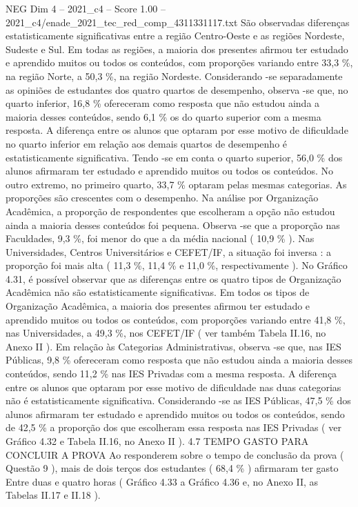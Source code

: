 \begin{textsample}{NEG Dim 4 – 2021\_c4 – Score 1.00 – 2021\_c4/enade\_2021\_tec\_red\_comp\_4311331117.txt}
São observadas diferenças estatisticamente significativas entre a região Centro-Oeste e as regiões Nordeste, Sudeste e Sul.
Em todas as regiões, a maioria dos presentes afirmou ter estudado e aprendido muitos ou todos os conteúdos, com proporções variando entre 33,3 \%, na região Norte, a 50,3 \%, na região Nordeste.
Considerando -se separadamente as opiniões de estudantes dos quatro quartos de desempenho, observa -se que, no quarto inferior, 16,8 \% ofereceram como resposta que não estudou ainda a maioria desses conteúdos, sendo 6,1 \% os do quarto superior com a mesma resposta.
A diferença entre os alunos que optaram por esse motivo de dificuldade no quarto inferior em relação aos demais quartos de desempenho é estatisticamente significativa.
Tendo -se em conta o quarto superior, 56,0 \% dos alunos afirmaram ter estudado e aprendido muitos ou todos os conteúdos.
No outro extremo, no primeiro quarto, 33,7 \% optaram pelas mesmas categorias.
As proporções são crescentes com o desempenho.
Na análise por Organização Acadêmica, a proporção de respondentes que escolheram a opção não estudou ainda a maioria desses conteúdos foi pequena.
Observa -se que a proporção nas Faculdades, 9,3 \%, foi menor do que a da média nacional ( 10,9 \% ).
Nas Universidades, Centros Universitários e CEFET/IF, a situação foi inversa : a proporção foi mais alta ( 11,3 \%, 11,4 \% e 11,0 \%, respectivamente ).
No Gráfico 4.31, é possível observar que as diferenças entre os quatro tipos de Organização Acadêmica não são estatisticamente significativas.
Em todos os tipos de Organização Acadêmica, a maioria dos presentes afirmou ter estudado e aprendido muitos ou todos os conteúdos, com proporções variando entre 41,8 \%, nas Universidades, a 49,3 \%, nos CEFET/IF ( ver também Tabela II.16, no Anexo II ).
Em relação às Categorias Administrativas, observa -se que, nas IES Públicas, 9,8 \% ofereceram como resposta que não estudou ainda a maioria desses conteúdos, sendo 11,2 \% nas IES Privadas com a mesma resposta.
A diferença entre os alunos que optaram por esse motivo de dificuldade nas duas categorias não é estatisticamente significativa.
Considerando -se as IES Públicas, 47,5 \% dos alunos afirmaram ter estudado e aprendido muitos ou todos os conteúdos, sendo de 42,5 \% a proporção dos que escolheram essa resposta nas IES Privadas ( ver Gráfico 4.32 e Tabela II.16, no Anexo II ). 4.7 TEMPO GASTO PARA CONCLUIR A PROVA Ao responderem sobre o tempo de conclusão da prova ( Questão 9 ), mais de dois terços dos estudantes ( 68,4 \% ) afirmaram ter gasto Entre duas e quatro horas ( Gráfico 4.33 a Gráfico 4.36 e, no Anexo II, as Tabelas II.17 e II.18 ).

\end{textsample}
